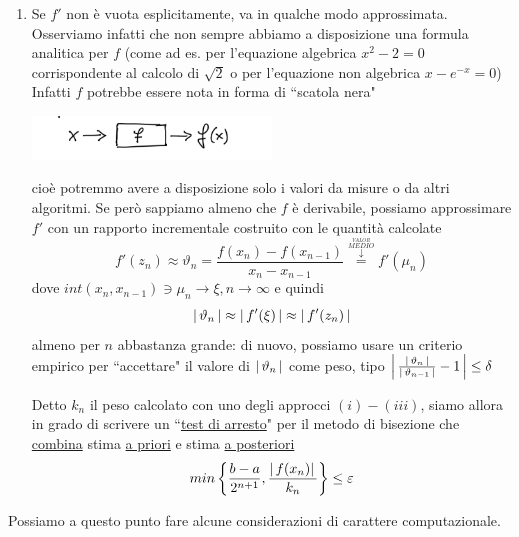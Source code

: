 \documentclass[12pt]{article}
\DeclarePairedDelimiter{\abs}{\lvert}{\rvert}
\begin{document}
\begin{enumerate}[label=\roman*)]
\item Se $f'$ non è vuota esplicitamente, va in qualche modo approssimata.\\Osserviamo infatti che non sempre abbiamo a disposizione una formula analitica per $f$ (come ad es. per l'equazione algebrica $x^2-2=0$ corrispondente al calcolo di $\sqrt{2}$ o per l'equazione non algebrica $x-e^{-x}=0$)\\
Infatti $f$ potrebbe essere nota in forma di ``scatola nera"\\
\begin{center}
\includegraphics[width=0.5\textwidth]{scatolanera.PNG}    
\end{center}
cioè potremmo avere a disposizione solo i valori da misure o da altri algoritmi. Se però sappiamo almeno che $f$ è derivabile, possiamo approssimare $f'$ con un rapporto incrementale costruito con le quantità calcolate 
\[f'(z_n)\approx \vartheta_n=\frac{f(x_n)-f(x_{n-1})}{x_n-x_{n-1}}\overset{\overset{\overset{VALOR}{MEDIO}}{\downarrow}}{=} f'(\mu_n)\]
dove $int(x_n,x_{n-1})\ni \mu_n \rightarrow \xi, n\rightarrow\infty$ e quindi 
\[\abs{\,\vartheta_n\,}\approx \abs{\,f'(\xi)\,} \approx\abs{\,f'(z_n)\,}\] almeno per $n$ abbastanza grande: di nuovo, possiamo usare un criterio empirico per ``accettare" il valore di $\abs{\,\vartheta_n\,}$ come peso, tipo $\abs*{\,\frac{\abs{\,\vartheta_n\,}}{\abs{\,\vartheta_{n-1}\,}}-1\,}\le \delta$ 

Detto $k_n$ il peso calcolato con uno degli approcci $(i)-(iii)$, siamo allora in grado di scrivere un ``\uline{test di arresto}" per il metodo di bisezione che \uline{combina} stima \uline{a priori} e stima \uline{a posteriori}
\[min\left\{\frac{b-a}{2^{n+1}},\frac{\abs{\,f(x_n)}\,}{k_n}\right\}\le \varepsilon\]
\end{enumerate}
Possiamo a questo punto fare alcune considerazioni di carattere computazionale.
\end{document}
